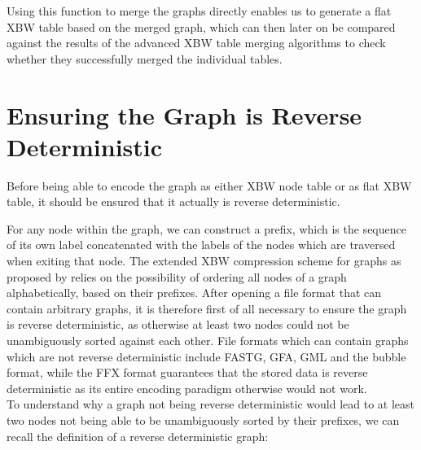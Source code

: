 \documentclass[a4paper,12pt,twoside,BCOR=10mm]{scrbook}
\begin{document}
Using this function to merge the graphs directly
enables us to generate a flat XBW table based on the merged graph,
which can then later on be compared against the results of the
advanced XBW table merging algorithms to check whether they successfully merged the individual tables.

\section{Ensuring the Graph is Reverse Deterministic}
\label{sec:why_rev_det}
%

Before being able to encode the graph as either XBW node table or as flat XBW table,
it should be ensured that it actually is reverse deterministic.

For any node within the graph, we can construct a prefix,
which is the sequence of its own label concatenated with the labels of the nodes which are
traversed when exiting that node.
The extended XBW compression scheme for graphs as proposed by \citet{Siren2014} relies
on the possibility of ordering all nodes of a graph alphabetically, based on their prefixes.
After opening a file format that can contain arbitrary graphs,
it is therefore first of all necessary to ensure the graph is reverse deterministic,
as otherwise at least two nodes could not be unambiguously sorted against each other.
File formats which can contain graphs which are not reverse deterministic include
FASTG, GFA, GML and the bubble format, while the FFX format guarantees that
the stored data is reverse deterministic as its entire encoding paradigm
otherwise would not work. \\
To understand why a graph not being reverse deterministic would lead to
at least two nodes not being able to be unambiguously sorted by their prefixes,
we can recall the definition of a reverse deterministic graph:
\end{document}

